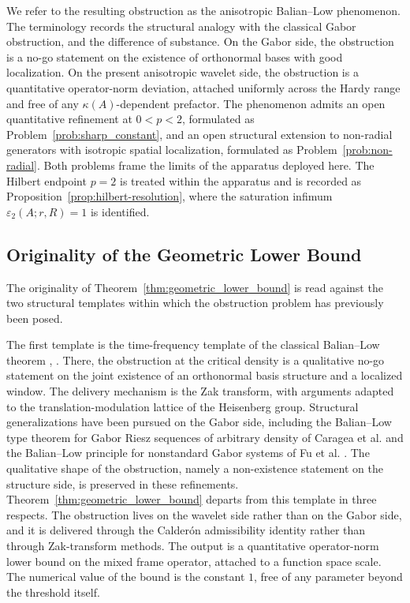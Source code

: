 \documentclass[pdflatex,sn-basic,Numbered]{sn-jnl}
\theoremstyle{thmstyleone}%
\theoremstyle{thmstylethree}%
\begin{document}
We refer to the resulting obstruction as the anisotropic Balian--Low
phenomenon. The terminology records the structural analogy with the
classical Gabor obstruction, and the difference of substance. On the
Gabor side, the obstruction is a no-go statement on the existence of
orthonormal bases with good localization. On the present anisotropic
wavelet side, the obstruction is a quantitative operator-norm
deviation, attached uniformly across the Hardy range and free of any
$\kappa(A)$-dependent prefactor. The phenomenon admits an open
quantitative refinement at $0 < p < 2$, formulated as
Problem~\ref{prob:sharp_constant}, and an open structural extension
to non-radial generators with isotropic spatial localization,
formulated as Problem~\ref{prob:non-radial}. Both problems frame the
limits of the apparatus deployed here. The Hilbert endpoint $p = 2$ is
treated within the apparatus and is recorded as
Proposition~\ref{prop:hilbert-resolution}, where the saturation
infimum $\varepsilon_2(A; r, R) = 1$ is identified.


\subsection{Originality of the Geometric Lower Bound}\label{subsec:originality}

The originality of Theorem~\ref{thm:geometric_lower_bound} is read
against the two structural templates within which the obstruction
problem has previously been posed.

The first template is the time-frequency template of the classical
Balian--Low theorem \cite[Theorem~4.1.1]{Daubechies1992},
\cite[Theorems~8.4.1 and~8.4.5]{Karlheinz2001}. There, the obstruction
at the critical density is a qualitative no-go statement on the joint
existence of an orthonormal basis structure and a localized window. The
delivery mechanism is the Zak transform, with arguments adapted to the
translation-modulation lattice of the Heisenberg group. Structural generalizations have been pursued on the Gabor side, including the
Balian--Low type theorem for Gabor Riesz sequences of arbitrary density
of Caragea et al. \cite{Andrei2025} and the
Balian--Low principle for nonstandard Gabor systems of Fu et al. \cite{Fu2011}. The qualitative shape of the obstruction,
namely a non-existence statement on the structure side, is preserved
in these refinements. Theorem~\ref{thm:geometric_lower_bound} departs
from this template in three respects. The obstruction lives on the
wavelet side rather than on the Gabor side, and it is delivered through
the Calder\'on admissibility identity rather than through Zak-transform
methods. The output is a quantitative operator-norm lower bound on the
mixed frame operator, attached to a function space scale. The numerical
value of the bound is the constant $1$, free of any parameter beyond
the threshold itself.
\end{document}
